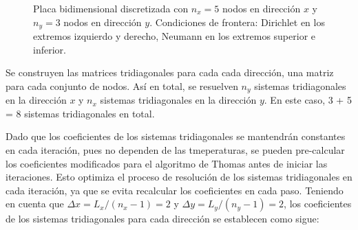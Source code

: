 \documentclass[11pt,a4paper]{article}
\begin{document}
\begin{figure}[h]
\centering
\captionsetup{justification=centering}
\caption{Placa bidimensional discretizada con $n_x=5$ nodos 
en dirección $x$ y $n_y=3$ nodos en dirección $y$. Condiciones de frontera: 
Dirichlet en los extremos izquierdo y derecho, Neumann en los extremos 
superior e inferior.}
\label{fig:placa_2d}
\end{figure}

Se construyen las matrices tridiagonales para cada cada direcci\'on, una 
matriz para cada conjunto de nodos. As\'i en total, se resuelven $n_y$ 
sistemas tridiagonales en la direcci\'on $x$ y $n_x$ sistemas tridiagonales en 
la direcci\'on $y$. En este caso, 3 + 5 = 8 sistemas tridiagonales en total.

\medskip

Dado que los coeficientes de los sistemas tridiagonales se mantendr\'an constantes
en cada iteraci\'on, pues no dependen de las tmeperaturas, se pueden 
pre-calcular los coeficientes modificados para el algoritmo de Thomas antes 
de iniciar las iteraciones. Esto optimiza el proceso de resoluci\'on de los 
sistemas tridiagonales en cada iteraci\'on, ya que se evita recalcular los 
coeficientes en cada paso. Teniendo en cuenta que $\Delta x = L_x/(n_x - 1) = 2$
y $\Delta y = L_y/(n_y - 1) = 2$, los coeficientes de los sistemas tridiagonales 
para cada dirección se establecen como sigue:
\end{document}
